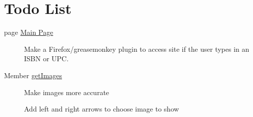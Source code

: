 \hypertarget{todo}{}\section{Todo List}\label{todo}
\label{todo__todo000001}
\hypertarget{todo__todo000001}{}
 \begin{description}
\item[page \hyperlink{index}{Main Page} ]Make a Firefox/greasemonkey plugin to access site if the user types in an ISBN or UPC.

\end{description}


\label{todo__todo000002}
\hypertarget{todo__todo000002}{}
 \begin{description}
\item[Member \hyperlink{product_8inc_9dbb778854cfe105058d7161ca8f058c}{getImages} ]Make images more accurate 

Add left and right arrows to choose image to show \end{description}

